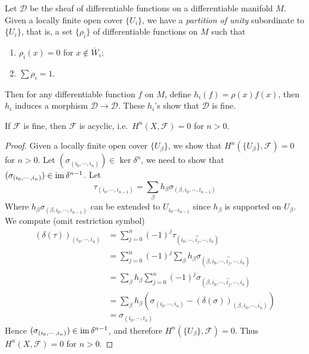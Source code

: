 \begin{eg}
    Let $\mathcal{D}$ be the sheaf of differentiable functions on a differentiable manifold $M$.
    Given a locally finite open cover $\{U_i\}$, we have a \emph{partition of unity} subordinate to $\{U_i\}$, that is, a set $\{\rho_i\}$ of differentiable functions on $M$ such that
    \begin{enumerate}[(1)]
        \item $\rho_i(x)=0$ for $x\notin\overline{W}_i$;
        \item $\sum\rho_i=1$.
    \end{enumerate}
    Then for any differentiable function $f$ on $M$, define $h_i(f)=\rho(x)f(x)$, then $h_i$ induces a morphism $\mathcal{D}\to\mathcal{D}$.
    These $h_i$'s show that $\mathcal{D}$ is fine.
\end{eg}

\begin{thm}
    If $\mathcal{F}$ is fine, then $\mathcal{F}$ is acyclic, i.e.\ $H^n(X,\mathcal{F})=0$ for $n>0$. 
\end{thm}
\begin{proof}
    Given a locally finite open cover $\{U_\beta\}$, we show that $H^n(\{U_\beta\},\mathcal{F})=0$ for $n>0$.
    Let $(\sigma_{(i_0,\cdots,i_n)})\in\ker\delta^n$, we need to show that $(\sigma_{(i_0,\cdots,i_n)})\in\operatorname{im}\delta^{n-1}$.
    Let
    \[\tau_{(i_0,\cdots,i_{n-1})}=\sum_{\beta}h_\beta\sigma_{(\beta,i_0,\cdots,i_{n-1})}\]
    Where $h_\beta\sigma_{(\beta,i_0,\cdots,i_{n-1})}$ can be extended to $U_{i_0\cdots i_{n-1}}$ since $h_\beta$ is supported on $U_\beta$.
    We compute (omit restriction symbol)
    \begin{align*}
        (\delta(\tau))_{(i_0,\cdots,i_n)}&=\sum_{j=0}^n(-1)^j\tau_{(i_0,\cdots,\widehat{i_j},\cdots,i_n)}\\
        &=\sum_{j=0}^n(-1)^j\sum_\beta h_\beta\sigma_{(\beta,i_0,\cdots,\widehat{i_j},\cdots,i_n)}\\
        &=\sum_\beta h_\beta\sum_{j=0}^n(-1)^j\sigma_{(\beta,i_0,\cdots,\widehat{i_j},\cdots,i_n)}\\
        &=\sum_\beta h_\beta(\sigma_{(i_0,\cdots,i_n)}-(\delta(\sigma))_{(\beta,i_0,\cdots,i_n)})\\
        &=\sigma_{(i_0,\cdots,i_n)}
    \end{align*}
    Hence $(\sigma_{(i_0,\cdots,i_n)})\in\operatorname{im}\delta^{n-1}$, and therefore $H^n(\{U_\beta\},\mathcal{F})=0$.
    Thus $H^n(X,\mathcal{F})=0$ for $n>0$.
\end{proof}

